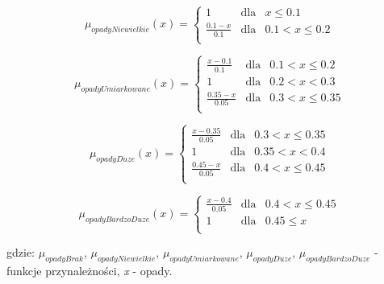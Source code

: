 \documentclass{classrep}
\begin{document}
\begin{equation}
\mu _{opadyNiewielkie}(x) =  \left\{ \begin{array}{rcl}
 1 & \mbox{dla} & x  \leq 0.1 \\
\frac{0.1- x}{0.1} & \mbox{dla} & 0.1 < x \leq 0.2\\
\end{array}\right.
\end{equation}

\begin{equation}
\mu _{opadyUmiarkowane}(x) =  \left\{ \begin{array}{rcl}
\frac{x - 0.1}{0.1} & \mbox{dla} & 0.1 < x \leq 0.2\\
1 & \mbox{dla} & 0.2 < x < 0.3\\
\frac{0.35 - x}{0.05} & \mbox{dla} & 0.3 < x \leq 0.35\\
\end{array}\right.
\end{equation}


\begin{equation}
\mu _{opadyDuze}(x) =  \left\{ \begin{array}{rcl}
\frac{x - 0.35}{0.05} & \mbox{dla} & 0.3 < x \leq 0.35\\
1 & \mbox{dla} & 0.35 < x < 0.4\\
\frac{0.45 - x}{0.05} & \mbox{dla} & 0.4 < x \leq 0.45\\
\end{array}\right.
\end{equation}

\begin{equation}
\mu _{opadyBardzoDuze}(x) =  \left\{ \begin{array}{rcl}
\frac{x - 0.4}{0.05} & \mbox{dla} & 0.4 < x \leq 0.45\\
1 & \mbox{dla} & 0.45 \leq x\\
\end{array}\right.
\end{equation}

gdzie: \(\mu _{opadyBrak}\), \(\mu _{opadyNiewielkie}\), \(\mu _{opadyUmiarkowane}\), \(\mu _{opadyDuze}\), \(\mu _{opadyBardzoDuze}\)  - funkcje przynależności, \textit{x} - opady. 
\end{document}
